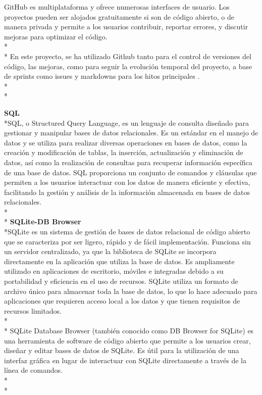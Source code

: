 \documentclass[a4paper,12pt,twoside]{memoir}
\begin{document}
GitHub es multiplataforma y ofrece numerosas interfaces de usuario. Los proyectos pueden ser alojados gratuitamente si son de código abierto, o de manera privada y permite a los usuarios contribuir, reportar errores, y discutir mejoras para optimizar el código.\\*\\* En este proyecto, se ha utilizado Github tanto para el control de versiones del código, las mejoras, como para seguir la evolución temporal del proyecto, a base de sprints como issues y markdowns para los hitos principales
\cite{fernandez-2019}.\\*\\*

\textbf{SQL}\\*SQL, o Structured Query Language, es un lenguaje de consulta diseñado para gestionar y manipular bases de datos relacionales. Es un estándar en el manejo de datos y se utiliza para realizar diversas operaciones en bases de datos, como la creación y modificación de tablas, la inserción, actualización y eliminación de datos, así como la realización de consultas para recuperar información específica de una base de datos. SQL proporciona un conjunto de comandos y cláusulas que permiten a los usuarios interactuar con los datos de manera eficiente y efectiva, facilitando la gestión y análisis de la información almacenada en bases de datos relacionales\cite{date1989guide}.\\*\\*
\textbf{SQLite-DB Browser}\\*SQLite es un sistema de gestión de bases de datos relacional de código abierto que se caracteriza por ser ligero, rápido y de fácil implementación. Funciona sin un servidor centralizado, ya que la biblioteca de SQLite se incorpora directamente en la aplicación que utiliza la base de datos. Es ampliamente utilizado en aplicaciones de escritorio, móviles e integradas debido a su portabilidad y eficiencia en el uso de recursos. SQLite utiliza un formato de archivo único para almacenar toda la base de datos, lo que lo hace adecuado para aplicaciones que requieren acceso local a los datos y que tienen requisitos de recursos limitados\cite{sqlite}.\\*\\* SQLite Database Browser (también conocido como DB Browser for SQLite) es una herramienta de software de código abierto que permite a los usuarios crear, diseñar y editar bases de datos de SQLite. Es útil para la utilización de una interfaz gráfica en lugar de interactuar con SQLite directamente a través de la línea de comandos\cite{dbbrowser}.\\*\\*
\end{document}
